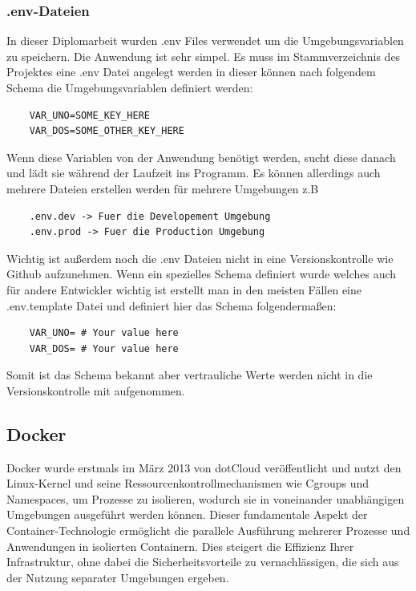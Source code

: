 \subsubsection{.env-Dateien}
In dieser Diplomarbeit wurden .env Files verwendet um die Umgebungsvariablen zu speichern. Die Anwendung ist sehr simpel. Es muss im Stammverzeichnis des Projektes eine .env Datei angelegt werden in dieser können nach folgendem Schema die Umgebungsvariablen definiert werden:
\begin{verbatim}
    VAR_UNO=SOME_KEY_HERE
    VAR_DOS=SOME_OTHER_KEY_HERE
\end{verbatim}

Wenn diese Variablen von der Anwendung benötigt werden, sucht diese danach und lädt sie während der Laufzeit ins Programm. 
Es können allerdings auch mehrere Dateien erstellen werden für mehrere Umgebungen z.B
\begin{verbatim}
    .env.dev -> Fuer die Developement Umgebung
    .env.prod -> Fuer die Production Umgebung
\end{verbatim}

Wichtig ist außerdem noch die .env Dateien nicht in eine Versionskontrolle wie Github aufzunehmen. Wenn ein spezielles Schema definiert wurde welches auch für andere Entwickler wichtig ist erstellt man in den meisten Fällen eine .env.template Datei und definiert hier das Schema folgendermaßen:

\begin{verbatim}
    VAR_UNO= # Your value here
    VAR_DOS= # Your value here
\end{verbatim}

Somit ist das Schema bekannt aber vertrauliche Werte werden nicht in die Versionskontrolle mit aufgenommen.


\cite{Umgebungsvariablen}




\subsection{Docker}

Docker wurde erstmals im März 2013 von dotCloud veröffentlicht und nutzt den Linux-Kernel und seine Ressourcenkontrollmechanismen wie Cgroups und Namespaces, um Prozesse zu isolieren, wodurch sie in voneinander unabhängigen Umgebungen ausgeführt werden können. Dieser fundamentale Aspekt der Container-Technologie ermöglicht die parallele Ausführung mehrerer Prozesse und Anwendungen in isolierten Containern. Dies steigert die Effizienz Ihrer Infrastruktur, ohne dabei die Sicherheitsvorteile zu vernachlässigen, die sich aus der Nutzung separater Umgebungen ergeben.

